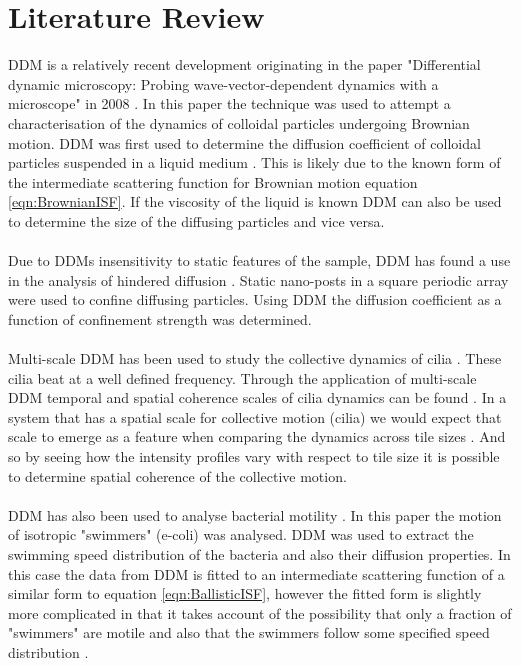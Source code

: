 \documentclass[11pt]{article}
\begin{document}
\section{Literature Review}
DDM is a relatively recent development originating in the paper "Differential dynamic microscopy: Probing wave-vector-dependent dynamics with a microscope" in 2008 \cite{ddm0}. In this paper the technique was used to attempt a characterisation of the dynamics of colloidal particles undergoing Brownian motion. DDM was first used to determine the diffusion coefficient of colloidal particles suspended in a liquid medium \cite{ddm0} \cite{ddm_maths}. This is likely due to the known form of the intermediate scattering function for Brownian motion equation \ref{eqn:BrownianISF}. If the viscosity of the liquid is known DDM can also be used to determine the size of the diffusing particles \cite{ddm1} and vice versa. 
\\\\
Due to DDMs insensitivity to static features of the sample, DDM has found a use in the analysis of hindered diffusion \cite{nanoposts}. Static nano-posts in a square periodic array were used to confine diffusing particles. Using DDM the diffusion coefficient as a function of confinement strength was determined.
\\\\
Multi-scale DDM has been used to study the collective dynamics of cilia \cite{ddm2}. These cilia beat at a well defined frequency. Through the application of multi-scale DDM temporal and spatial coherence scales of cilia dynamics can be found \cite{ddm1}. In a system that has a spatial scale for collective motion (cilia) we would expect that scale to emerge as a feature when comparing the dynamics across tile sizes \cite{ddm1}. And so by seeing how the intensity profiles vary with respect to tile size it is possible to determine spatial coherence of the collective motion.
\\\\
DDM has also been used to analyse bacterial motility \cite{bacterial_motility}. In this paper the motion of isotropic "swimmers" (e-coli) was analysed. DDM was used to extract the swimming speed distribution of the bacteria and also their diffusion properties. In this case the data from DDM is fitted to an intermediate scattering function of a similar form to equation \ref{eqn:BallisticISF}, however the fitted form is slightly more complicated in that it takes account of the possibility that only a fraction of "swimmers" are motile and also that the swimmers follow some specified speed distribution \cite{bacterial_motility}.
\end{document}
